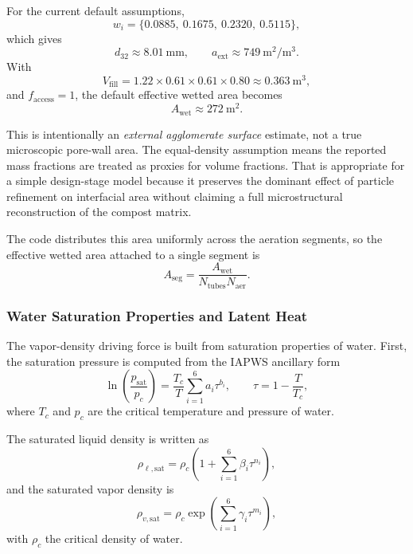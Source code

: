 \documentclass{article}
\begin{document}
For the current default assumptions,
\begin{equation}
w_i = \{0.0885,\ 0.1675,\ 0.2320,\ 0.5115\},
\end{equation}
which gives
\begin{equation}
d_{32} \approx 8.01\ \mathrm{mm},
\qquad
a_{\mathrm{ext}} \approx 749\ \mathrm{m^2/m^3}.
\end{equation}
With
\begin{equation}
V_{\mathrm{fill}} = 1.22 \times 0.61 \times 0.61 \times 0.80
\approx 0.363\ \mathrm{m^3},
\end{equation}
and $f_{\mathrm{access}}=1$, the default effective wetted area becomes
\begin{equation}
A_{\mathrm{wet}} \approx 272\ \mathrm{m^2}.
\end{equation}

This is intentionally an \emph{external agglomerate surface} estimate, not a
true microscopic pore-wall area. The equal-density assumption means the
reported mass fractions are treated as proxies for volume fractions. That is
appropriate for a simple design-stage model because it preserves the dominant
effect of particle refinement on interfacial area without claiming a full
microstructural reconstruction of the compost matrix.

The code distributes this area uniformly across the aeration segments, so the
effective wetted area attached to a single segment is
\begin{equation}
A_{\mathrm{seg}}
= \frac{A_{\mathrm{wet}}}{N_{\mathrm{tubes}} N_{\mathrm{aer}}}.
\end{equation}

\subsubsection{Water Saturation Properties and Latent Heat}

The vapor-density driving force is built from saturation properties of water.
First, the saturation pressure is computed from the IAPWS ancillary form
\begin{equation}
\ln\!\left(\frac{p_{\mathrm{sat}}}{p_c}\right)
= \frac{T_c}{T}\sum_{i=1}^{6} a_i \tau^{b_i},
\qquad
\tau = 1 - \frac{T}{T_c},
\end{equation}
where $T_c$ and $p_c$ are the critical temperature and pressure of water.

The saturated liquid density is written as
\begin{equation}
\rho_{\ell,\mathrm{sat}}
= \rho_c \left(1 + \sum_{i=1}^{6} \beta_i \tau^{n_i}\right),
\end{equation}
and the saturated vapor density is
\begin{equation}
\rho_{v,\mathrm{sat}}
= \rho_c \exp\!\left(\sum_{i=1}^{6} \gamma_i \tau^{m_i}\right),
\end{equation}
with $\rho_c$ the critical density of water.
\end{document}
